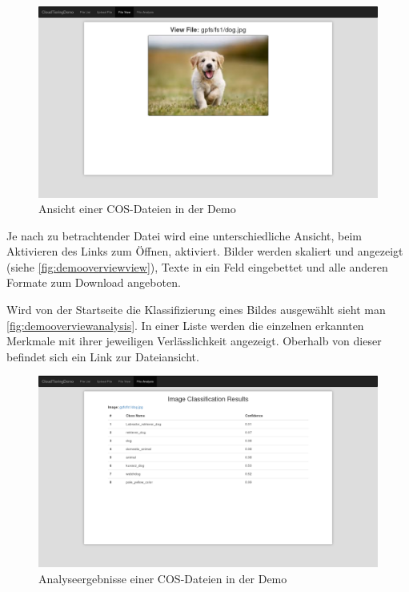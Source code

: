 \begin{figure}[hbt]
	\centering
	\includegraphics[scale=0.25]{images/demo-overview-view}
	\caption{Ansicht einer COS-Dateien in der Demo}
	\label{fig:demooverviewview}
\end{figure}

Je nach zu betrachtender Datei wird eine unterschiedliche Ansicht, beim Aktivieren des Links zum Öffnen, aktiviert. Bilder werden skaliert und angezeigt (siehe \autoref{fig:demooverviewview}), Texte in ein Feld eingebettet und alle anderen Formate zum Download angeboten.

Wird von der Startseite die Klassifizierung eines Bildes ausgewählt sieht man \autoref{fig:demooverviewanalysis}. In einer Liste werden die einzelnen erkannten Merkmale mit ihrer jeweiligen Verlässlichkeit angezeigt. Oberhalb von dieser befindet sich ein Link zur Dateiansicht.
\begin{figure}[hbt]
	\centering
	\includegraphics[scale=0.25]{images/demo-overview-analysis}
	\caption{Analyseergebnisse einer COS-Dateien in der Demo}
	\label{fig:demooverviewanalysis}
\end{figure}


